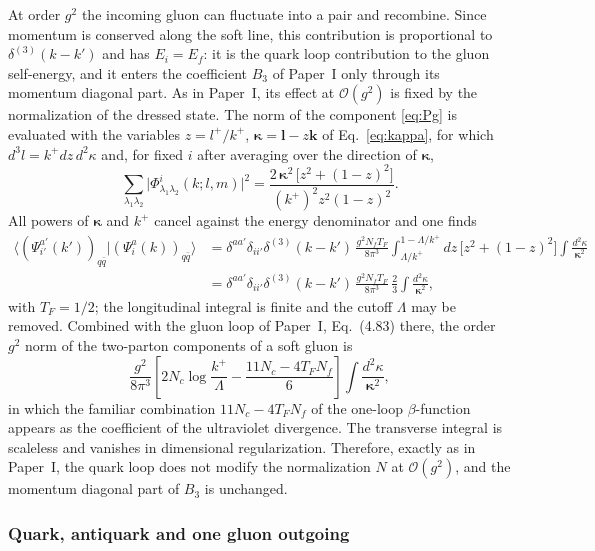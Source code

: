 \documentclass[11pt,a4paper]{article}
\numberwithin{equation}{section}
\newcommand{\dthree}{\delta^{(3)}}
\newcommand{\Ph}{\Phi}
\newcommand{\order}[1]{\mathcal{O}(#1)}
\newcommand{\Nf}{N_{f}}
\begin{document}
At order $g^{2}$ the incoming gluon can fluctuate into a pair and recombine. Since momentum is
conserved along the soft line, this contribution is proportional to $\dthree(k-k')$ and has
$E_{i}=E_{f}$: it is the quark loop contribution to the gluon self-energy, and it enters the
coefficient $B_{3}$ of Paper~I only through its momentum diagonal part. As in Paper~I, its effect
at $\order{g^{2}}$ is fixed by the normalization of the dressed state. The norm of the component
\eqref{eq:Pg} is evaluated with the variables $z=l^{+}/k^{+}$, $\bm\kappa=\bm l-z\bm k$ of
Eq.~\eqref{eq:kappa}, for which $d^{3}l=k^{+}dz\,d^{2}\kappa$ and, for fixed $i$ after averaging over the direction of
$\bm\kappa$,
\begin{equation}
\sum_{\lambda_{1}\lambda_{2}}\big|\Ph^{i}_{\lambda_{1}\lambda_{2}}(k;l,m)\big|^{2}
=\frac{2\,\bm\kappa^{2}\,\big[z^{2}+(1-z)^{2}\big]}{(k^{+})^{2}z^{2}(1-z)^{2}} .
\label{eq:PhiSq}
\end{equation}
All powers of $\bm\kappa$ and $k^{+}$ cancel against the energy denominator and one finds
\begin{align}
\big\langle(\Psi^{a'}_{i'}(k'))_{q\bar q}\big|(\Psi^{a}_{i}(k))_{q\bar q}\big\rangle
&=\delta^{aa'}\delta_{ii'}\dthree(k-k')\,\frac{g^{2}\Nf T_{F}}{8\pi^{3}}
\int_{\Lambda/k^{+}}^{1-\Lambda/k^{+}}\!\!dz\,\big[z^{2}+(1-z)^{2}\big]\int\!\frac{d^{2}\kappa}{\bm\kappa^{2}}
\nonumber\\
&=\delta^{aa'}\delta_{ii'}\dthree(k-k')\,\frac{g^{2}\Nf T_{F}}{8\pi^{3}}\,\frac{2}{3}\int\!\frac{d^{2}\kappa}{\bm\kappa^{2}},
\label{eq:qloop}
\end{align}
with $T_{F}=1/2$; the longitudinal integral is finite and the cutoff $\Lambda$ may be removed.
Combined with the gluon loop of Paper~I, Eq.~(4.83) there, the order $g^{2}$ norm of the
two-parton components of a soft gluon is
\begin{equation}
\frac{g^{2}}{8\pi^{3}}\left[2N_{c}\log\frac{k^{+}}{\Lambda}-\frac{11N_{c}-4T_{F}\Nf}{6}\right]
\int\!\frac{d^{2}\kappa}{\bm\kappa^{2}},
\label{eq:gnorm}
\end{equation}
in which the familiar combination $11N_{c}-4T_{F}\Nf$ of the one-loop $\beta$-function appears as
the coefficient of the ultraviolet divergence. The transverse integral is scaleless and vanishes
in dimensional regularization. Therefore, exactly as in Paper~I, the quark loop does not modify
the normalization $N$ at $\order{g^{2}}$, and the momentum diagonal part of $B_{3}$ is unchanged.

\subsubsection{Quark, antiquark and one gluon outgoing}
\end{document}
